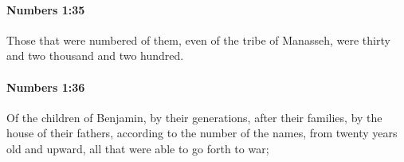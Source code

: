 		\paragraph{Numbers 1:35} %
			\label{NUMBERS-1-35}

			Those that were numbered of them, even of the tribe of Manasseh, were thirty and two thousand and two hundred.


		\paragraph{Numbers 1:36} %
			\label{NUMBERS-1-36}

			Of the children of Benjamin, by their generations, after their families, by the house of their fathers, according to the number of the names, from twenty years old and upward, all that were able to go forth to war;


